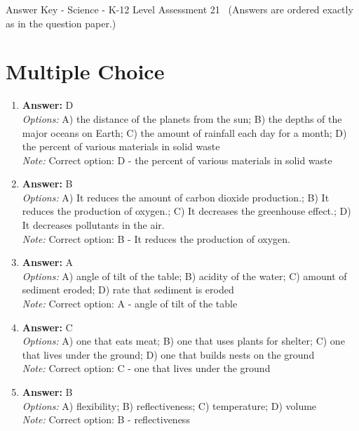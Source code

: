 \documentclass[12pt]{article}
\begin{document}
\begin{center}
Answer Key - Science - K-12 Level Assessment 21 \
\small (Answers are ordered exactly as in the question paper.)
\end{center}

\section*{Multiple Choice}
\begin{enumerate}[label=\arabic*.]
\item \textbf{Answer:} D
\\ \textit{Options:} A) the distance of the planets from the sun; B) the depths of the major oceans on Earth; C) the amount of rainfall each day for a month; D) the percent of various materials in solid waste
\\ \textit{Note:} Correct option: D - the percent of various materials in solid waste
\item \textbf{Answer:} B
\\ \textit{Options:} A) It reduces the amount of carbon dioxide production.; B) It reduces the production of oxygen.; C) It decreases the greenhouse effect.; D) It decreases pollutants in the air.
\\ \textit{Note:} Correct option: B - It reduces the production of oxygen.
\item \textbf{Answer:} A
\\ \textit{Options:} A) angle of tilt of the table; B) acidity of the water; C) amount of sediment eroded; D) rate that sediment is eroded
\\ \textit{Note:} Correct option: A - angle of tilt of the table
\item \textbf{Answer:} C
\\ \textit{Options:} A) one that eats meat; B) one that uses plants for shelter; C) one that lives under the ground; D) one that builds nests on the ground
\\ \textit{Note:} Correct option: C - one that lives under the ground
\item \textbf{Answer:} B
\\ \textit{Options:} A) flexibility; B) reflectiveness; C) temperature; D) volume
\\ \textit{Note:} Correct option: B - reflectiveness
\end{enumerate}
\end{document}
